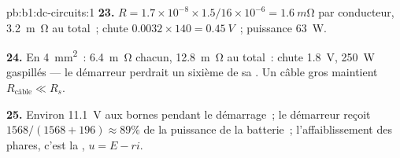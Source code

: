 \begin{solution}{pb:b1:dc-circuits:1}
\textbf{23.} $R = 1.7\times10^{-8} \times 1.5/16\times10^{-6} =
\qty{1.6}{m\ohm}$ par conducteur, \qty{3.2}{m\ohm} au total~; chute $0.0032
\times 140 = \qty{0.45}{V}$~; puissance \qty{63}{W}.

\textbf{24.} En \qty{4}{mm^2}~: \qty{6.4}{m\ohm} chacun, \qty{12.8}{m\ohm}
au total~: chute \qty{1.8}{V}, \qty{250}{W} gaspillés --- le démarreur
perdrait un sixième de sa . Un câble gros maintient $R_{\text{câble}} \ll R_s$.

\textbf{25.} Environ \qty{11.1}{V} aux bornes pendant le démarrage~; le
démarreur reçoit $1568/(1568 + 196) \approx 89\%$ de la puissance de la
batterie~; l'affaiblissement des phares, c'est la , $u = E - ri$.
\end{solution}
